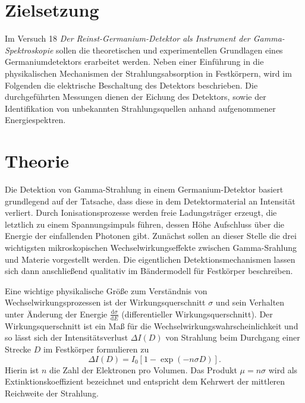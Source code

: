 \setcounter{page}{1}
\section*{Zielsetzung}
Im Versuch 18 \textit{Der Reinst-Germanium-Detektor als
Instrument der Gamma-Spektroskopie} sollen die theoretischen und experimentellen Grundlagen eines
Germaniumdetektors erarbeitet werden. Neben einer Einführung in die physikalischen Mechanismen der
Strahlungsabsorption in Festkörpern, wird im Folgenden die elektrische Beschaltung des Detektors beschrieben.
Die durchgeführten Messungen dienen der Eichung des Detektors, sowie der Identifikation von unbekannten
Strahlungsquellen anhand aufgenommener Energiespektren.

\section{Theorie}
Die Detektion von Gamma-Strahlung in einem Germanium-Detektor basiert grundlegend auf der Tatsache, dass diese in dem
Detektormaterial an Intensität verliert. Durch Ionisationsprozesse werden freie Ladungsträger erzeugt, die letztlich
zu einem Spannungsimpuls führen, dessen Höhe Aufschluss über die Energie der einfallenden Photonen gibt.
Zunächst sollen an dieser Stelle die drei wichtigsten mikroskopischen Wechselwirkungseffekte zwischen Gamma-Srahlung und
Materie vorgestellt werden. Die eigentlichen Detektionsmechanismen lassen sich dann anschließend qualitativ im
Bändermodell für Festkörper beschreiben.

Eine wichtige physikalische
Größe zum Verständnis von Wechselwirkungsprozessen ist der Wirkungsquerschnitt $\sigma$ und sein Verhalten unter
Änderung der Energie $\frac{\mathup{d}\sigma}{\mathup{d}E}$ (differentieller Wirkungsquerschnitt). Der Wirkungsquerschnitt
ist ein Maß für die Wechselwirkungswahrscheinlichkeit und so lässt sich der Intensitätsverlust $\Delta I(D)$ von Strahlung beim Durchgang einer
Strecke $D$ im Festkörper formulieren zu
\begin{equation}
    \Delta I(D) = I_0 \left[1 -  \exp\left(- n \sigma D\right)\right].
\end{equation}
Hierin ist $n$ die Zahl der Elektronen pro Volumen. Das Produkt $\mu = n \sigma$ wird als Extinktionskoeffizient
bezeichnet und entspricht dem Kehrwert der mittleren Reichweite der Strahlung.

